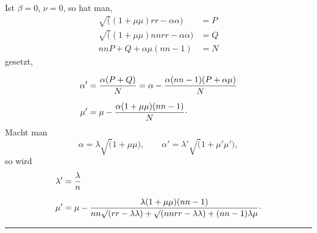 Ist $\beta=0$, $\nu=0$, so hat man,
\[
\begin{aligned}
\surd((1+\mu\mu)rr-\alpha\alpha)&=P\\
\surd((1+\mu\mu)nnrr-\alpha\alpha)&=Q\\
nnP+Q+\alpha\mu(nn-1)&=N
\end{aligned}
\]
\noindent gesetzt,
\par\HistoricalFoot{}{17\textsuperscript{*}}
\clearpage{}
\[
\begin{aligned}
\alpha'&=\frac{\alpha(P+Q)}N=\alpha-\frac{\alpha(nn-1)(P+\alpha\mu)}N\\[6pt]
\mu'&=\mu-\frac{\alpha(1+\mu\mu)(nn-1)}N\IVpoint
\end{aligned}
\]
\noindent\hspace*{\parindent}Macht man
\[
\alpha=\lambda\surd(1+\mu\mu),\qquad \alpha'=\lambda'\surd(1+\mu'\mu'),
\]
\noindent so wird
\[
\begin{aligned}
\lambda'&=\frac\lambda n\\[6pt]
\mu'&=\mu-\frac{\lambda(1+\mu\mu)(nn-1)}{nn\surd(rr-\lambda\lambda)+\surd(nnrr-\lambda\lambda)+(nn-1)\lambda\mu}\IVpoint
\end{aligned}
\]
\begin{center}\rule{.25\linewidth}{.4pt}\end{center}
\clearpage\endgroup
